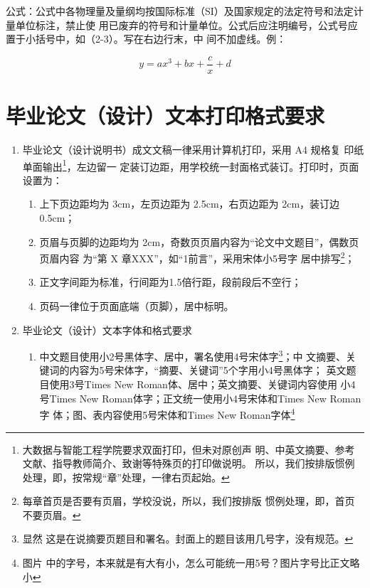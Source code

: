 公式：公式中各物理量及量纲均按国际标准（SI）及国家规定的法定符号和法定计量单位标注，禁止使
用已废弃的符号和计量单位。公式后应注明编号，公式号应置于小括号中，如（2-3）。写在右边行末，中
间不加虚线。例：

\begin{equation}
  \label{eq:1}
  y=ax^3+bx+\frac{c}{x}+d
\end{equation}

\section{毕业论文（设计）文本打印格式要求}

\begin{enumerate}
\item 毕业论文（设计说明书）成文文稿一律采用计算机打印，采用 A4 规格复
  印纸单面输出\footnote{大数据与智能工程学院要求双面打印，但未对原创声
    明、中英文摘要、参考文献、指导教师简介、致谢等特殊页的打印做说明。
    所以，我们按排版惯例处理，即，按常规“章”处理，一律右页起始。}，左边留一
  定装订边距，用学校统一封面格式装订。打印时，页面设置为：
  \begin{enumerate}
  \item 上下页边距均为 3cm，左页边距为 2.5cm，右页边距为 2cm，装订边 0.5cm；
  \item 页眉与页脚的边距均为 2cm，奇数页页眉内容为“论文中文题目”，偶数页页眉内容
    为“第 X 章\hspace{1ex}XXX”，如“1\hspace{1ex}前言”，采用宋体小5号字
    居中排写\footnote{每章首页是否要有页眉，学校没说，所以，我们按排版
      惯例处理，即，首页不要页眉。}；
  \item 正文字间距为标准，行间距为1.5倍行距，段前段后不空行；
  \item 页码一律位于页面底端（页脚），居中标明。
  \end{enumerate}
\item 毕业论文（设计）文本字体和格式要求
  \begin{enumerate}
  \item 中文题目使用小2号黑体字、居中，署名使用4号宋体字\footnote{显然
      这是在说摘要页题目和署名。封面上的题目该用几号字，没有规范。}；中
    文摘要、关键词的内容为5号宋体字，“摘要、关键词”5个字用小4号黑体字；
    英文题目使用3号Times New Roman体、居中；英文摘要、关键词内容使用
    小4号Times New Roman体字；正文统一使用小4号宋体和Times New Roman字
    体；图、表内容使用5号宋体和Times New Roman字体{\bug}\footnote{图片
      中的字号，本来就是有大有小，怎么可能统一用5号？图片字号比正文略小
}
\end{enumerate}
\end{enumerate}
